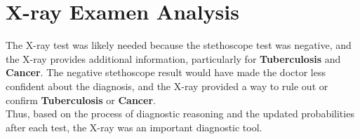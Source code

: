 \documentclass[../CSC_5RO11_TA_TP6.tex]{subfiles}
\begin{document}
\section{X-ray Examen Analysis}
\noindent The X-ray test was likely needed because the stethoscope test was negative, and the X-ray provides additional information, particularly for \textbf{Tuberculosis} and \textbf{Cancer}. The negative stethoscope result would have made the doctor less confident about the diagnosis, and the X-ray provided a way to rule out or confirm \textbf{Tuberculosis} or \textbf{Cancer}.\\

\noindent Thus, based on the process of diagnostic reasoning and the updated probabilities after each test, the X-ray was an important diagnostic tool.
\end{document}
